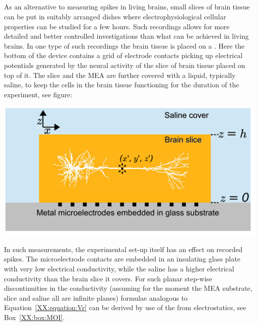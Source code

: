 \subsection{}
As an alternative to measuring spikes in living brains, small slices of brain tissue can be put in suitably arranged dishes
where electrophysiological cellular properties can be studied for a few hours. Such  recordings
allows for more detailed and better controlled investigations than what can be achieved in living brains. In one type of such recordings
the brain tissue is placed on a . Here the bottom of the device contains a grid of electrode
contacts picking up electrical potentials generated by the neural activity of the slice of  brain tissue placed on top of it. 
The slice and the MEA are further covered with a liquid, typically saline, to keep the cells in the brain tissue functioning for the duration
of the experiment,  see figure:
%
\begin{center}
\includegraphics{Figures/Spikes/Spikes-MEA-1-w43-r300}
\end{center}
\vspace*{6pt}
%
In such measurements, the experimental set-up itself has an effect on recorded spikes. The microelectrode contacts are 
embedded in an insulating glass plate with very low electrical conductivity, while the saline has
a higher electrical conductivity than the brain slice it covers. 
For such planar step-wise discontinuities in the conductivity (assuming for the moment the MEA substrate, slice and saline
all are infinite planes) formulae analogous to Equation~\ref{XX:equation:Vr} can be derived by use of the
 from electrostatics, see Box~\ref{XX:box:MOI}.

